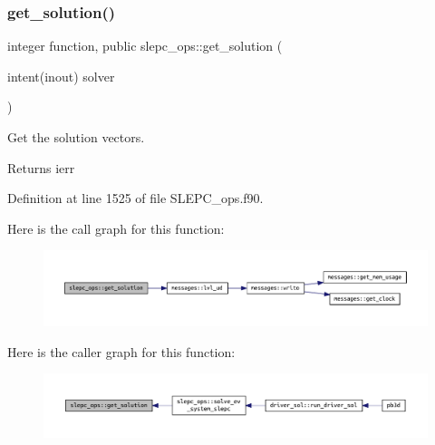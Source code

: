 \subsubsection{\texorpdfstring{get\+\_\+solution()}{get\_solution()}}
{\footnotesize\ttfamily integer function, public slepc\+\_\+ops\+::get\+\_\+solution (\begin{DoxyParamCaption}\item[{intent(inout)}]{solver }\end{DoxyParamCaption})}



Get the solution vectors. 

\begin{DoxyReturn}{Returns}
ierr 
\end{DoxyReturn}


Definition at line 1525 of file S\+L\+E\+P\+C\+\_\+ops.\+f90.

Here is the call graph for this function\+:\nopagebreak
\begin{figure}[H]
\begin{center}
\leavevmode
\includegraphics[width=350pt]{namespaceslepc__ops_aabe2aef90f039316bf3f03e651a6e7e0_cgraph}
\end{center}
\end{figure}
Here is the caller graph for this function\+:\nopagebreak
\begin{figure}[H]
\begin{center}
\leavevmode
\includegraphics[width=350pt]{namespaceslepc__ops_aabe2aef90f039316bf3f03e651a6e7e0_icgraph}
\end{center}
\end{figure}
\mbox{\label{namespaceslepc__ops_a05f8a23335ed47ad1996cddf3bcfdc2e}} 
